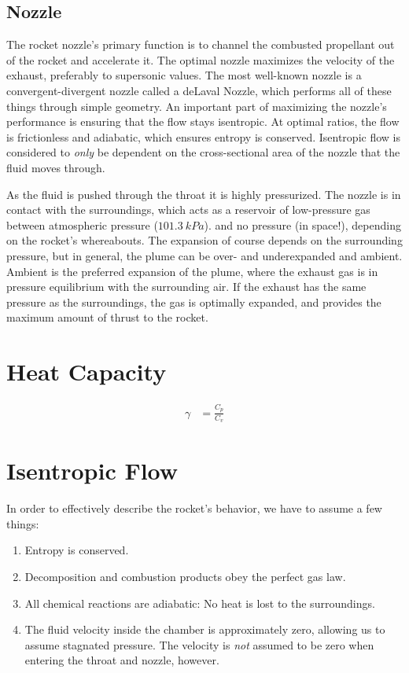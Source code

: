 \subsection{Nozzle}

	The rocket nozzle's primary function is to channel the combusted propellant out of the rocket and accelerate it. The optimal nozzle maximizes the velocity of the exhaust, preferably to supersonic values. The most well-known nozzle is a convergent-divergent nozzle called a deLaval Nozzle, which performs all of these things through simple geometry. An important part of maximizing the nozzle's performance is ensuring that the flow stays isentropic. At optimal ratios, the flow is frictionless and adiabatic, which ensures entropy is conserved. Isentropic flow is considered to \emph{only} be dependent on the cross-sectional area of the nozzle that the fluid moves through. \cite{nakkanozz}

	As the fluid is pushed through the throat it is highly pressurized. The nozzle is in contact with the surroundings, which acts as a reservoir of low-pressure gas between atmospheric pressure ($\SI{101.3}{kPa}$).
	and no pressure (in space!), depending on the rocket's whereabouts. The expansion of course depends on the surrounding pressure, but in general, the plume can be over- and underexpanded and ambient. Ambient is the preferred expansion of the plume, where the exhaust gas is in pressure equilibrium with the surrounding air. If the exhaust has the same pressure as the surroundings, the gas is optimally expanded, and provides the maximum amount of thrust to the rocket. \cite{robertnozzle}

\section{Heat Capacity}

 \begin{align}
	 \gamma &= \frac{C_p}{C_v}
 \end{align}

\section{Isentropic Flow}

	In order to effectively describe the rocket's behavior, we have to assume a few things:
	\begin{enumerate}[topsep=0pt,itemsep=-1ex,partopsep=1ex,parsep=1ex]
		\item{Entropy is conserved.}
		\item{Decomposition and combustion products obey the perfect gas law.}
		\item{All chemical reactions are adiabatic: No heat is lost to the surroundings.}
		\item{The fluid velocity inside the chamber is approximately zero, allowing us to assume stagnated pressure. The velocity is \emph{not} assumed to be zero when entering the throat and nozzle, however.}
	\end{enumerate}

